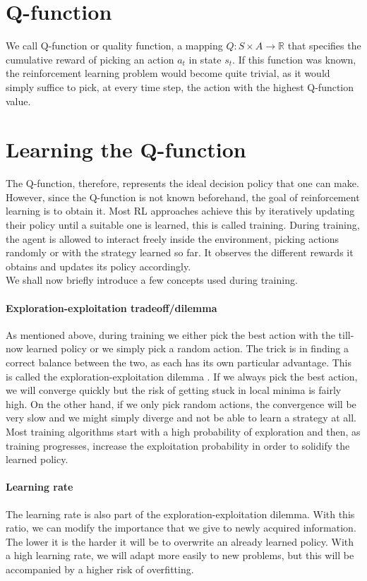  \section{Q-function}
 We call Q-function or quality function, a mapping $Q:S \times A \rightarrow \mathbb{R}$ that specifies the cumulative reward of picking an action $a_t$ in state $s_t$. If this function was known, the reinforcement learning problem would become quite trivial, as it would simply suffice to pick, at every time step, the action with the highest Q-function value.
 
 \section{Learning the Q-function} 
The Q-function, therefore, represents the ideal decision policy that one can make. However, since the Q-function is not known beforehand, the goal of reinforcement learning is to obtain it. Most RL approaches achieve this by iteratively updating their policy until a suitable one is learned, this is called training. During training, the agent is allowed to interact freely inside the environment, picking actions randomly or with the strategy learned so far. It observes the different rewards it obtains and updates its policy accordingly.\\ 
We shall now briefly introduce a few concepts used during training.
\paragraph{Exploration-exploitation tradeoff/dilemma}
As mentioned above, during training we either pick the best action with the till-now learned policy or we simply pick a random action. The trick is in finding a correct balance between the two, as each has its own particular advantage. This is called the exploration-exploitation dilemma \cite{yogeswaran2012reinforcement}. If we always pick the best action, we will converge quickly but the risk of getting stuck in local minima is fairly high. On the other hand, if we only pick random actions, the convergence will be very slow and we might simply diverge and not be able to learn a strategy at all. Most training algorithms start with a high probability of exploration and then, as training progresses, increase the exploitation probability in order to solidify the learned policy.
\paragraph{Learning rate}
The learning rate is also part of the exploration-exploitation dilemma. With this ratio, we can modify the importance that we give to newly acquired information. The lower it is the harder it will be to overwrite an already learned policy. With a high learning rate, we will adapt more easily to new problems, but this will be accompanied by a higher risk of overfitting.

